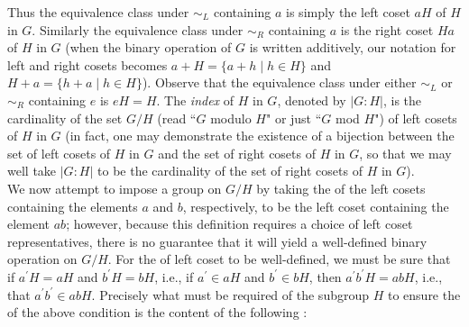 \documentclass[12pt]{article}
\theoremstyle{plain}
\theoremstyle{definition}
\newcommand{\set}[1]{\{#1\}}
\newcommand{\abs}[1]{\vert#1\vert}
\begin{document}
Thus the equivalence class under $\sim_L$ containing $a$ is simply the left coset $aH$ of $H$ in $G$. Similarly the equivalence class under $\sim_R$ containing $a$ is the right coset $Ha$ of $H$ in $G$ (when the binary operation of $G$ is written additively, our notation for left and right cosets becomes $a+H=\set{a+h\mid h\in H}$ and $H+a=\set{h+a\mid h\in H}$). Observe that the equivalence class under either $\sim_L$ or $\sim_R$ containing $e$ is $eH=H$. The \emph{index} of $H$ in $G$, denoted by $\abs{G:H}$, is
the cardinality of the set $G/H$ (read ``$G$ modulo $H$" or just ``$G$ mod $H$") of left cosets of $H$ in $G$ (in fact, one may demonstrate the existence of a bijection
between the set of left cosets of $H$ in $G$ and the set of right cosets of $H$ in $G$, so that we may well take $\abs{G:H}$ to be the cardinality of the set of right cosets of $H$ in $G$).\\  

We now attempt to impose a group on $G/H$ by taking the  of the left cosets containing the elements 
$a$ and $b$, respectively, to be the left coset containing the element $ab$; however, because this definition requires a choice of left coset representatives, there is no guarantee that it will yield a well-defined binary operation on $G/H$.  For the  of left coset  to be well-defined, we must be sure that if $a^\prime H=aH$ and $b^\prime H=bH$, i.e., if $a^\prime\in aH$ and $b^\prime\in bH$, then $a^\prime b^\prime H=abH$, i.e., that $a^\prime b^\prime\in abH$. Precisely what must be  required of the subgroup $H$ to ensure the  of the above condition is the content of the following :
\end{document}
